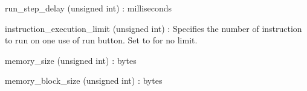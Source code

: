 \begin{DoxyItemize}
\begin{DoxyItemize}
\begin{DoxyItemize}
\item {\ttfamily run\+\_\+step\+\_\+delay} (unsigned int) \+: milliseconds
\item {\ttfamily instruction\+\_\+execution\+\_\+limit} (unsigned int) \+: Specifies the number of instruction to run on one use of {\ttfamily run} button. Set to {} for no limit.
\end{DoxyItemize}
\item {\ttfamily {}}
\begin{DoxyItemize}
\item {\ttfamily memory\+\_\+size} (unsigned int) \+: bytes
\item {\ttfamily memory\+\_\+block\+\_\+size} (unsigned int) \+: bytes ~\newline
 
\end{DoxyItemize}
\end{DoxyItemize}
\end{DoxyItemize}